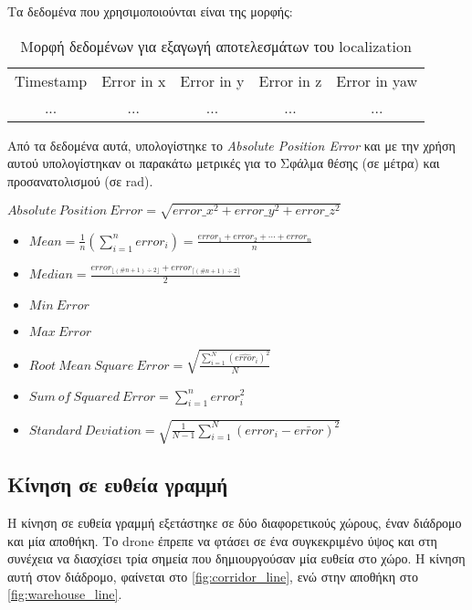 Τα δεδομένα που χρησιμοποιούνται είναι της μορφής:
\begin{table}[H]
    \begin{center}
        \caption{Μορφή δεδομένων για εξαγωγή αποτελεσμάτων του localization}
        \label{tab:localization_data}
        \begin{tabular}{| c | c | c | c | c |}
        \hline
        \rowcolor{Gray}
        Timestamp & Error in x & Error in y & Error in z & Error in yaw \\
        ... & ... & ... & ... & ... \\
        \hline
        \end{tabular}
    \end{center}
\end{table}

Από τα δεδομένα αυτά, υπολογίστηκε το \emph{Absolute Position Error} και με την χρήση αυτού υπολογίστηκαν οι παρακάτω μετρικές για το  Σφάλμα θέσης (σε μέτρα) και προσανατολισμού (σε rad).

\begin{center}
    $Absolute\: Position\: Error = \sqrt{{error\_x}^2 + {error\_y}^2 + {error\_z}^2}$ 
\end{center}

\begin{itemize}
    \item{$Mean = {\frac {1}{n}}\left(\sum _{i=1}^{n}{error_{i}}\right)={\frac {error_{1}+error_{2}+\cdots +error_{n}}{n}}$ }
    \item{$Median = {\frac {error_{\lfloor (\#n+1)\div 2\rfloor }+error_{\lceil (\#n+1)\div 2\rceil }}{2}}$}
    \item{$Min\: Error$}
    \item{$Max\: Error$}
    \item{$Root\: Mean\: Square\: Error = {\sqrt{\frac {\sum _{i=1}^{N}({\hat {error}}_{i})^{2}}{N}}}$}
    \item{$Sum\: of\: Squared\: Error = \sum _{i=1}^{n} error_{i}^{2}$}
    \item{$Standard\: Deviation = {\sqrt {{\frac {1}{N-1}}\sum _{i=1}^{N}(error_{i}-{\bar {error}})^{2}}}$}
\end{itemize}

\subsection{Κίνηση σε ευθεία γραμμή}
\label{subsection:localization_tests_line}
Η κίνηση σε ευθεία γραμμή εξετάστηκε σε δύο διαφορετικούς χώρους, έναν διάδρομο και μία αποθήκη. Το drone έπρεπε να φτάσει σε ένα συγκεκριμένο ύψος και στη συνέχεια να διασχίσει τρία σημεία που δημιουργούσαν μία ευθεία στο χώρο. Η κίνηση αυτή στον διάδρομο, φαίνεται στο \autoref{fig:corridor_line}, ενώ στην αποθήκη στο \autoref{fig:warehouse_line}.

